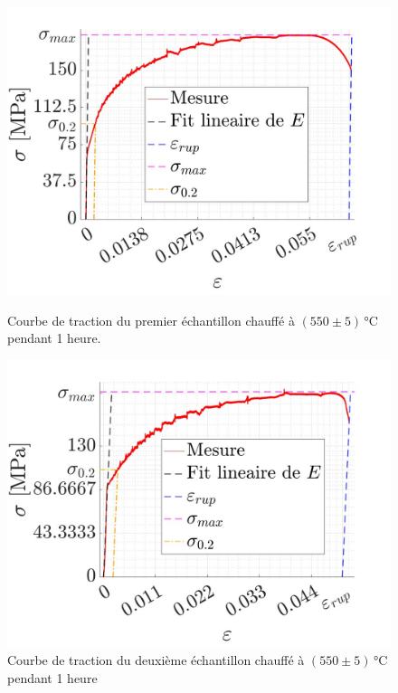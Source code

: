 \documentclass[a4paper, 12pt,oneside]{article}
\begin{document}
\begin{figure}[H]
    \centering
    \begin{minipage}{0.45\textwidth}
        \centering
        \includegraphics[width=\linewidth]{GRAPHES/Graphe_4.jpg}
        \captionsetup{justification=centering}
        \caption{Courbe de traction du premier échantillon chauffé à $(550 \pm 5 )$\,°C pendant 1 heure.}
        \label{fig5}
    \end{minipage}
    \hfill
    \begin{minipage}{0.45\textwidth}
        \centering
        \includegraphics[width=\linewidth]{GRAPHES/Graphe_3.jpg}
        \captionsetup{justification=centering}
        \caption{Courbe de traction du deuxième échantillon chauffé à $(550 \pm 5 )$\,°C pendant 1 heure}
        \label{fig6}
    \end{minipage}
\end{figure}
\end{document}
